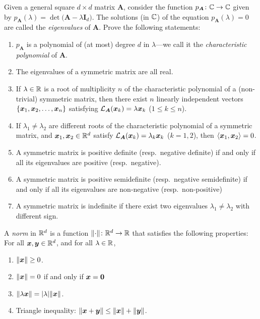 \begin{problem}[Eigenvalues]\label{problem:eigenvalues}
Given a general square $d \times d$ matrix $\boldsymbol{A}$, consider the function $p_{\boldsymbol{A}} \colon \mathbb{C} \to \mathbb{C}$ given by $p_{\boldsymbol{A}}(\lambda) = \det\big(\boldsymbol{A} - \lambda \boldsymbol{I}_d \big)$.  The solutions (in $\mathbb{C}$) of the equation $p_{\boldsymbol{A}}(\lambda)=0$ are called the \emph{eigenvalues} of $\boldsymbol{A}$.  Prove the following statements:
\begin{enumerate}
	\item $p_{\boldsymbol{A}}$ is a polynomial of (at most) degree $d$ in $\lambda$---we call it the \emph{characteristic polynomial} of $\boldsymbol{A}$.
	\item The eigenvalues of a symmetric matrix are all real.
	\item If $\lambda \in \mathbb{R}$ is a root  of multiplicity $n$ of the characteristic polynomial of a (non-trivial) symmetric matrix, then there exist $n$ linearly independent vectors $\{ \boldsymbol{x}_1, \boldsymbol{x}_2, \dotsc, \boldsymbol{x}_n \}$ satisfying $\mathcal{L}_{\boldsymbol{A}} (\boldsymbol{x}_k) = \lambda \boldsymbol{x}_k$ ($1\leq k \leq n$).
	\item If $\lambda_1 \neq \lambda_2$ are different roots of the characteristic polynomial of a symmetric matrix, and $\boldsymbol{x}_1, \boldsymbol{x}_2 \in \mathbb{R}^d$ satisfy $\mathcal{L}_{\boldsymbol{A}}(\boldsymbol{x}_k) = \lambda_k \boldsymbol{x}_k$ ($k=1,2$), then $\langle \boldsymbol{x}_1, \boldsymbol{x}_2 \rangle = 0$.
	\item A symmetric matrix is positive definite (resp.~negative definite) if and only if all its eigenvalues are positive (resp.~negative).
	\item A symmetric matrix is positive semidefinite (resp.~negative semidefinite) if and only if all its eigenvalues are non-negative (resp.~non-positive)
	\item A symmetric matrix is indefinite if there exist two eigenvalues $\lambda_1 \neq \lambda_2$ with different sign.
\end{enumerate}
\end{problem}

\begin{example}[Norms]\label{example:norm}
A \emph{norm} in $\mathbb{R}^d$ is a function $\lVert \cdot \rVert \colon \mathbb{R}^d \to \mathbb{R}$ that satisfies the following properties:
For all $\boldsymbol{x}, \boldsymbol{y} \in \mathbb{R}^d$, and for all $\lambda \in \mathbb{R}$,
\begin{enumerate}
	\item $\lVert \boldsymbol{x} \rVert \geq 0$.
	\item $\lVert \boldsymbol{x} \rVert = 0$ if and only if $\boldsymbol{x} = \boldsymbol{0}$
	\item $\lVert  \lambda \boldsymbol{x} \rVert = \lvert \lambda \rvert \lVert \boldsymbol{x} \rVert$.
	\item Triangle inequality: $\lVert \boldsymbol{x} + \boldsymbol{y} \rVert \leq \lVert \boldsymbol{x} \rVert + \lVert \boldsymbol{y} \rVert$.
\end{enumerate}
\end{example}

